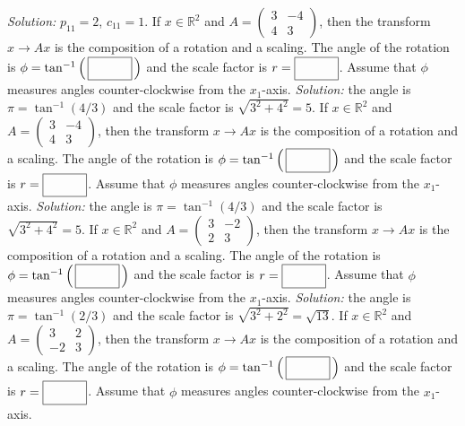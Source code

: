 \begin{parts}
        \ifnum {} {\color{DarkBlue} \textit{Solution:} $p_{11} = 2$, $c_{11} = 1$.  } \fi      
    \fi 
    \ifnum {}
        If $x \in \mathbb R^2$ and $A = \begin{pmatrix} 3&-4\\4&3\end{pmatrix}$, then the transform $x \to Ax$ is the composition of a rotation and a scaling. The angle of the rotation is $\phi = \tan^{-1} \left( \, \framebox{\strut\hspace{1cm}}\, \right)$ and the scale factor is $r = \framebox{\strut\hspace{1cm}}$. Assume that $\phi$ measures angles counter-clockwise from the $x_1$-axis. 
        \ifnum {} {\color{DarkBlue} \textit{Solution:} the angle is $\pi = \tan ^{-1} (4/3)$ and the scale factor is $\sqrt{3^2 + 4^2} = 5$. } \fi    
    \fi 
    \ifnum {}
        If $x \in \mathbb R^2$ and $A = \begin{pmatrix} 3&-4\\4&3\end{pmatrix}$, then the transform $x \to Ax$ is the composition of a rotation and a scaling. The angle of the rotation is $\phi = \tan^{-1} \left( \, \framebox{\strut\hspace{1cm}}\, \right)$ and the scale factor is $r = \framebox{\strut\hspace{1cm}}$. Assume that $\phi$ measures angles counter-clockwise from the $x_1$-axis. 
        \ifnum {} {\color{DarkBlue} \textit{Solution:} the angle is $\pi = \tan ^{-1} (4/3)$ and the scale factor is $\sqrt{3^2 + 4^2} = 5$. } \fi  
    \fi 
    \ifnum {}
        If $x \in \mathbb R^2$ and $A = \begin{pmatrix} 3&-2\\2&3\end{pmatrix}$, then the transform $x \to Ax$ is the composition of a rotation and a scaling. The angle of the rotation is $\phi = \tan^{-1} \left( \, \framebox{\strut\hspace{1cm}}\, \right)$ and the scale factor is $r = \framebox{\strut\hspace{1cm}}$. Assume that $\phi$ measures angles counter-clockwise from the $x_1$-axis. 
        \ifnum {} {\color{DarkBlue} \textit{Solution:} the angle is $\pi = \tan ^{-1} (2/3)$ and the scale factor is $\sqrt{3^2 + 2^2} = \sqrt{13}$. } \fi
    \fi    
    \ifnum {}
        If $x \in \mathbb R^2$ and $A = \begin{pmatrix} 3&2\\-2&3\end{pmatrix}$, then the transform $x \to Ax$ is the composition of a rotation and a scaling. The angle of the rotation is $\phi = \tan^{-1} \left( \, \framebox{\strut\hspace{1cm}}\, \right)$ and the scale factor is $r = \framebox{\strut\hspace{1cm}}$. Assume that $\phi$ measures angles counter-clockwise from the $x_1$-axis. 

\end{parts}
